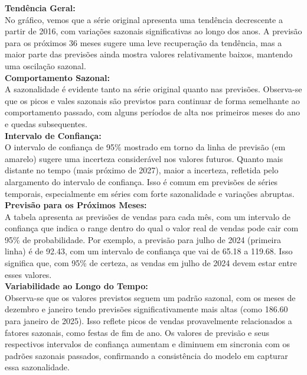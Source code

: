 \documentclass[a4paper, 12pt]{article}
\begin{document}
\textbf{Tendência Geral:}\\
No gráfico, vemos que a série original apresenta uma tendência decrescente a partir de 2016, com variações sazonais significativas ao longo dos anos. A previsão para os próximos 36 meses sugere uma leve recuperação da tendência, mas a maior parte das previsões ainda mostra valores relativamente baixos, mantendo uma oscilação sazonal.\\

\textbf{Comportamento Sazonal:}\\
A sazonalidade é evidente tanto na série original quanto nas previsões. Observa-se que os picos e vales sazonais são previstos para continuar de forma semelhante ao comportamento passado, com alguns períodos de alta nos primeiros meses do ano e quedas subsequentes.\\

\textbf{Intervalo de Confiança:}\\
O intervalo de confiança de 95\% mostrado em torno da linha de previsão (em amarelo) sugere uma incerteza considerável nos valores futuros. Quanto mais distante no tempo (mais próximo de 2027), maior a incerteza, refletida pelo alargamento do intervalo de confiança. Isso é comum em previsões de séries temporais, especialmente em séries com forte sazonalidade e variações abruptas.\\


\textbf{Previsão para os Próximos Meses:}\\
A tabela apresenta as previsões de vendas para cada mês, com um intervalo de confiança que indica o range dentro do qual o valor real de vendas pode cair com 95\% de probabilidade.
Por exemplo, a previsão para julho de 2024 (primeira linha) é de 92.43, com um intervalo de confiança que vai de 65.18 a 119.68. Isso significa que, com 95\% de certeza, as vendas em julho de 2024 devem estar entre esses valores.\\

\textbf{Variabilidade ao Longo do Tempo:}\\
Observa-se que os valores previstos seguem um padrão sazonal, com os meses de dezembro e janeiro tendo previsões significativamente mais altas (como 186.60 para janeiro de 2025). Isso reflete picos de vendas provavelmente relacionados a fatores sazonais, como festas de fim de ano.
Os valores de previsão e seus respectivos intervalos de confiança aumentam e diminuem em sincronia com os padrões sazonais passados, confirmando a consistência do modelo em capturar essa sazonalidade.\\
\end{document}
